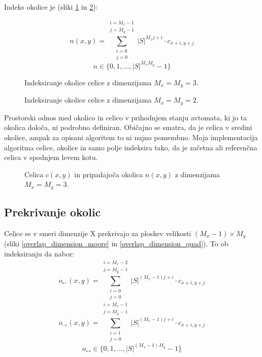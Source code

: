 \documentclass[12pt,a4paper,openany,twoside]{book}
\begin{document}
Indeks okolice je (sliki \ref{neighborhood_index_moore} in \ref{neighborhood_index_quad}):

\begin{equation}
n(x,y) = \sum_{\substack{i=0 \\ j=0}}^{\substack{i=M_x-1 \\ j=M_y-1}} |S|^{M_x j + i} \cdot c_{x+i,y+j}
\end{equation}
\begin{equation}
n \in \{0, 1, \ldots, |S|^{M_x M_y}-1\}
\end{equation}

\begin{figure}[htb]
\centerline{}
\caption[Indeksiranje okolice \(3 \times 3\).]{Indeksiranje okolice celice z dimenzijama \(M_x=M_y=3\).}
\label{neighborhood_index_moore}
\end{figure}

\begin{figure}[htb]
\centerline{}
\caption[Indeksiranje okolice \(2 \times 2\).]{Indeksiranje okolice celice z dimenzijama \(M_x=M_y=2\).}
\label{neighborhood_index_quad}
\end{figure}

Prostorski odnos med okolico in celico v prihodnjem stanju avtomata, ki jo ta okolica določa,
ni podrobno definiran. Običajno se smatra, da je celica v sredini okolice, ampak za opisani algoritem to ni
nujno pomembno. Moja implementacija algoritma celice, okolice in samo polje indeksira tako,
da je začetna ali referenčna celica v spodnjem levem kotu.

\begin{figure}[htb]
\centerline{}
\caption[Velikost okolice.]{Celica \(c(x,y)\) in pripadajoča okolica \(n(x,y)\) z dimenzijama \(M_x=M_y=3\).}
\label{neighborhood}
\end{figure}

\subsection{Prekrivanje okolic}

Celice se v smeri dimenzije X prekrivajo za ploskev velikosti \((M_x-1) \times M_y\) (sliki \ref{overlap_dimension_moore} in \ref{overlap_dimension_quad}).
To ob indeksiranju da nabor:
\begin{equation}
o_{\leftarrow}(x,y) = \sum_{\substack{i=0 \\ j=0}}^{\substack{i=M_x-2 \\ j=M_y-1}} |S|^{(M_x-1) j + i} \cdot c_{x+i,y+j}
\end{equation}
\begin{equation}
o_{\rightarrow}(x,y) = \sum_{\substack{i=1 \\ j=0}}^{\substack{i=M_x-1 \\ j=M_y-1}} |S|^{(M_x-1) j + i} \cdot c_{x+i,y+j}
\end{equation}
\begin{equation}
o_{\leftrightarrow} \in \{0, 1, \ldots, |S|^{(M_x-1)M_y}-1\}
\end{equation}
\end{document}
